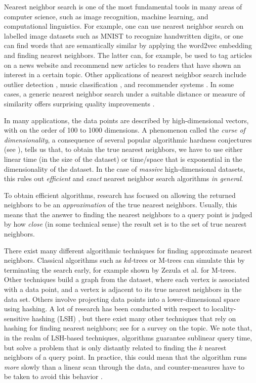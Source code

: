 Nearest neighbor search is one of the most fundamental tools in many areas of computer science, such as image recognition, machine learning, and computational linguistics.   For example, 
one can use nearest neighbor search on labelled image datasets such as MNIST \cite{Lecun98} to recognize handwritten digits, or one can find words that are semantically similar by applying the \textsf{word2vec} embedding \cite{Mikolov13} and finding nearest neighbors. The latter can, for example, be used to tag articles on a news website and recommend new articles to readers that have shown an interest in a certain topic. Other applications of nearest neighbor search include outlier detection \cite{KirnerSZ17}, music classification \cite{PalmasonOASK17}, and recommender systems \cite{Herlocker99}.
In some cases, a generic
nearest neighbor search under a suitable distance or measure of similarity offers surprising quality improvements \cite{BoytsovNMN16}.

In many applications, the data points are described by high-dimensional vectors, with on the order of 100 to 1000 dimensions.
A phenomenon called the \emph{curse of dimensionality},
a consequence of several popular algorithmic hardness conjectures (see \cite{AlmanW15,Williams05}),
tells us that, to obtain the true nearest neighbors, we have to use either linear time (in the 
size of the dataset) or time/space that is exponential in the dimensionality of the dataset. 
In the case of \emph{massive} high-dimensional datasets, this rules out \emph{efficient} and \emph{exact} nearest neighbor search algorithms \emph{in general}.  

To obtain efficient algorithms, research has focused on allowing the returned neighbors to be an \emph{approximation} of the true nearest neighbors. Usually, this means that the answer to finding the nearest neighbors to a query point is judged by how 
\emph{close} (in some technical sense) the result set is to the set of true nearest neighbors. 

There exist many different algorithmic techniques for finding approximate nearest neighbors.
Classical algorithms such as $kd$-trees \cite{kdtree} or M-trees \cite{CiacciaPZ97} can simulate this by terminating the search early, for example shown by 
Zezula et al. \cite{ZezulaSAR98} for M-trees. Other techniques \cite{hnsw,swgraph} build a graph from the dataset, where each vertex is associated with a data point, and a vertex is adjacent to its true nearest neighbors in the data set. Others involve projecting data points into a lower-dimensional space using hashing. 
A lot of research has been conducted with respect to locality-sensitive hashing (LSH) \cite{IndykM98}, but there exist many other 
techniques that rely on hashing for finding nearest neighbors; see \cite{AndoniI16,wang} for a survey on the topic. 
We note that, in the realm of LSH-based techniques, algorithms guarantee sublinear query time, but solve a problem that is only distantly related to finding the $k$ nearest neighbors of a query point.
In practice, this could mean that the algorithm runs \emph{more} slowly than a linear scan through the data, and counter-measures have to be taken to avoid this behavior \cite{AhleAP17,Pham17}. 

